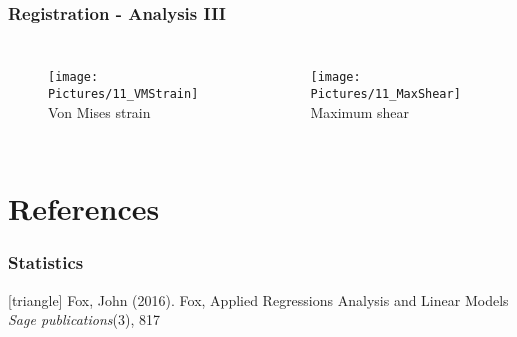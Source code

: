 \documentclass[xcolor=table]{beamer}
\begin{document}
\begin{frame}
	\frametitle{Registration - Analysis III}
	\begin{columns}
		\centering
		\begin{figure}
			\texttt{[image: Pictures/11\_VMStrain]}\\
			Von Mises strain
		\end{figure}
		\centering
		\begin{figure}
			\texttt{[image: Pictures/11\_MaxShear]}\\
			Maximum shear
		\end{figure}
	\end{columns}
\end{frame}



\appendix

\section{References}
\begin{frame}
	\frametitle{Statistics}
	\footnotesize{
		\begin{thebibliography}{99}
			[triangle]
			 Fox, John (2016).
			\newblock Fox, Applied Regressions Analysis and Linear Models
			\newblock \textit{Sage publications}(3), 817
		\end{thebibliography}
	}
\end{frame}

\end{document}
